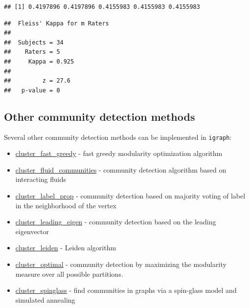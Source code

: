 \documentclass[
]{book}
\newenvironment{Shaded}{\begin{snugshade}}{\end{snugshade}}
\newcommand{\CommentTok}[1]{\textcolor[rgb]{0.56,0.35,0.01}{\textit{#1}}}
\newcommand{\ControlFlowTok}[1]{\textcolor[rgb]{0.13,0.29,0.53}{\textbf{#1}}}
\newcommand{\FunctionTok}[1]{\textcolor[rgb]{0.13,0.29,0.53}{\textbf{#1}}}
\newcommand{\NormalTok}[1]{#1}
\newcommand{\OtherTok}[1]{\textcolor[rgb]{0.56,0.35,0.01}{#1}}
\newcommand{\SpecialCharTok}[1]{\textcolor[rgb]{0.81,0.36,0.00}{\textbf{#1}}}
\providecommand{\tightlist}{%
  \setlength{\itemsep}{0pt}\setlength{\parskip}{0pt}}
\begin{document}
\begin{verbatim}
## [1] 0.4197896 0.4197896 0.4155983 0.4155983 0.4155983
\end{verbatim}

\begin{Shaded}
\end{Shaded}

\begin{verbatim}
##  Fleiss' Kappa for m Raters
## 
##  Subjects = 34 
##    Raters = 5 
##     Kappa = 0.925 
## 
##         z = 27.6 
##   p-value = 0
\end{verbatim}

\subsection{Other community detection methods}\label{other-community-detection-methods}

Several other community detection methods can be implemented in \texttt{igraph}:

\begin{itemize}
\tightlist
\item
  \href{https://igraph.org/r/doc/cluster_fast_greedy.html}{cluster\_fast\_greedy} - fast greedy modularity optimization algorithm
\item
  \href{https://igraph.org/r/doc/cluster_fluid_communities.html}{cluster\_fluid\_communities} - community detection algorithm based on interacting fluids
\item
  \href{https://igraph.org/r/doc/cluster_label_prop.html}{cluster\_label\_prop} - community detection based on majority voting of label in the neighborhood of the vertex
\item
  \href{https://igraph.org/r/doc/cluster_leading_eigen.html}{cluster\_leading\_eigen} - community detection based on the leading eigenvector
\item
  \href{https://igraph.org/r/doc/cluster_leiden.html}{cluster\_leiden} - Leiden algorithm
\item
  \href{https://igraph.org/r/doc/cluster_optimal.html}{cluster\_optimal} - community detection by maximizing the modularity measure over all possible partitions.
\item
  \href{https://igraph.org/r/doc/cluster_spinglass.html}{cluster\_spinglass} - find communities in graphs via a spin-glass model and simulated annealing
\end{itemize}
\end{document}
